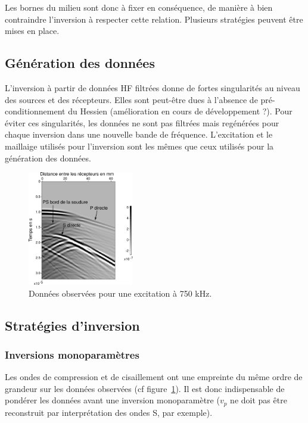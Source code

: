 \documentclass[a4paper,11pt]{report} %
\begin{document}
Les bornes du milieu sont donc à fixer en conséquence, de manière à bien contraindre l'inversion à respecter cette relation. Plusieurs stratégies peuvent être mises en place.

\subsection{Génération des données}

L'inversion à partir de données HF filtrées donne de fortes singularités au niveau des sources et des récepteurs. Elles sont peut-être dues à l'absence de pré-conditionnement du Hessien (amélioration en cours de développement ?). Pour éviter ces singularités, les données ne sont pas filtrées mais regénérées pour chaque inversion dans une nouvelle bande de fréquence. L'excitation et le maillaige utilisés pour l'inversion sont les mêmes que ceux utilisés pour la génération des données.

\begin{figure}[!h]
	\centering
	\includegraphics[height=5cm]{img/multi_trans/data_750k.png}
	\caption{Données observées pour une excitation à 750 kHz.\label{data_obs}}

\end{figure}

\subsection{Stratégies d'inversion}


\subsubsection{Inversions monoparamètres}
Les ondes de compression et de cisaillement ont une empreinte du même ordre de grandeur sur les données observées (cf figure~\ref{data_obs}). Il est donc indispensable de pondérer les données avant une inversion monoparamètre ($v_{p}$ ne doit pas être reconstruit par interprétation des ondes S, par exemple).
\end{document}
